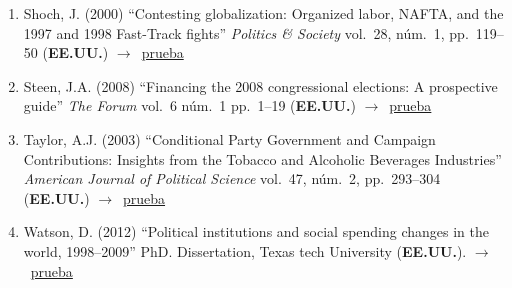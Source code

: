 \documentclass[12 pt, letter]{article}
\newenvironment{CitasMiTrabajo}{
    \begin{footnotesize}
    \begin{enumerate}[label={\footnotesize\emph{cita~\arabic*}},ref=\arabic*] %
        \setlength{\itemsep}{.1\itemsep}
        \setlength{\parskip}{.1\parskip}
    }{\end{enumerate}\end{footnotesize}}
\begin{document}
\begin{CitasMiTrabajo}
        \item Shoch, J. (2000)
        ``Contesting globalization: Organized labor, NAFTA, and the 1997 and 1998 Fast-Track fights'' \emph{Politics \& Society} vol.\ 28, n\'um.\ 1, pp.\ 119--50  (\textbf{EE.UU.}) $\rightarrow$~\href{https://github.com/emagar/cv/blob/master/citasMiTrab/coxMagar/shoch.pdf}{prueba}

       \item Steen, J.A. (2008) ``Financing the 2008 congressional elections: A prospective guide'' \emph{The Forum} vol.\ 6 n\'um.\ 1 pp.\ 1--19 (\textbf{EE.UU.}) $\rightarrow$~\href{https://github.com/emagar/cv/blob/master/citasMiTrab/coxMagar/steen2008.pdf}{prueba}

        \item Taylor, A.J. (2003)
        ``Conditional Party Government and Campaign Contributions: Insights
        from the Tobacco and Alcoholic Beverages Industries'' \emph{American
        Journal of Political Science} vol.\ 47, n\'um.\ 2, pp.\ 293--304  (\textbf{EE.UU.}) $\rightarrow$~\href{https://github.com/emagar/cv/blob/master/citasMiTrab/coxMagar/taylor.pdf}{prueba}

        \item Watson, D. (2012) ``Political institutions and social spending changes in the world, 1998--2009'' PhD. Dissertation, Texas tech University (\textbf{EE.UU.}). $\rightarrow$~\href{https://github.com/emagar/cv/blob/master/citasMiTrab/coxMagar/watson2012.pdf}{prueba}
        
        \label{ncites:cox.magar.1999} %

%
         

\end{CitasMiTrabajo}
\end{document}
